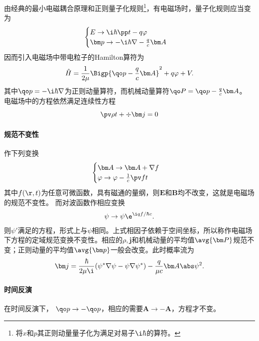 由经典的最小电磁耦合原理和正则量子化规则\footnote{将$x$和$p$其正则动量量子化为满足对易子$\i\hbar$的算符。}，有电磁场时，量子化规则应当变为
\begin{align}
	\begin{cases}
		E\to\i\hbar\pp t-q\varphi \\
		\bm p\to-\i\hbar\nabla-\frac qc\bm A
	\end{cases}
\end{align}
因而引入电磁场中带电粒子的Hamilton算符为
\begin{align}
	\hat H=\frac1{2\mu}\Bigp{\qo p-\frac qc\bm A}^2+q\varphi+V.
\end{align}
其中$\qo p=-\i\hbar\nabla$为正则动量算符，而机械动量算符$\qo P=\qo p-\frac qc\bm A$。
电磁场中的\Schr 方程依然满足连续性方程
\[
	\pv\rho{t}+\div\bm j=0
\]
\paragraph{规范不变性}作下列变换
\begin{align}
	\begin{cases}
		\bm A\to\bm A+\nabla f\\
		\varphi\to\varphi-\frac1c\pv ft
	\end{cases}
\end{align}
其中$f(\r,t)$为任意可微函数，具有磁通的量纲，则$\bm E$和$\bm B$均不改变，这就是电磁场的规范不变性。
而对波函数作相应变换
\begin{align}
	\psi\to\psi\e^{\i qf/\hbar c}.
\end{align}
则$\psi'$满足的\Schr 方程，形式上与$\psi$相同。上式相因子依赖于空间坐标，所以称作电磁场下\Schr 方程的定域规范变换不变性。相应的$\rho,\bm j$和机械动量的平均值$\avg{\bm P}$规范不变；正则动量的平均值$\avg{\bm p}$一般会改变。此时概率流为
\[
\bm j=\frac{\hbar}{2\mu\i}(\psi^*\nabla\psi-\psi\nabla\psi^*)-\frac{q}{\mu c}\bm A\abs\psi^2.
\]
\paragraph{时间反演}在时间反演下，
$\qo p\to-\qo p$，相应的需要$\bm A\to-\bm A$，方程才不变。
\newpage
